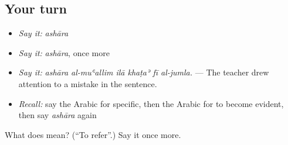 \subsection*{Your turn}
\begin{itemize}
\raggedright
  \item \emph{Say it:} \emph{ashāra}
  \item \emph{Say it:} \emph{ashāra}, once more
  \item \emph{Say it:} \emph{ashāra al-muʿallim ilā khaṭaʾ fī al-jumla.} — The teacher drew attention to a mistake in the sentence.
  \item \emph{Recall:} say the Arabic for specific, then the Arabic for to become evident, then say \emph{ashāra} again
\end{itemize}

\begin{tcolorbox}[breakable,colback=teal!4,colframe=teal!35!black,title={Before you move on}]
What does  mean? (\textquotedblleft{}To refer\textquotedblright{}.) Say it once more.
\end{tcolorbox}
